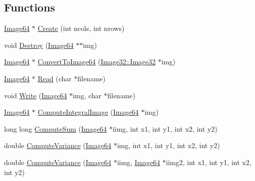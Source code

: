 \subsection*{Functions}
\begin{DoxyCompactItemize}
\item 
\hyperlink{namespacegft_1_1Image64_ac41e270d01650c5cce783ab7e97ccab0}{Image64} $\ast$ \hyperlink{namespacegft_1_1Image64_a6b21c5315c407dfab9d48562bffd18aa}{Create} (int ncols, int nrows)
\item 
void \hyperlink{namespacegft_1_1Image64_ad4e315bef549fd02b6aa360a12f1257e}{Destroy} (\hyperlink{namespacegft_1_1Image64_ac41e270d01650c5cce783ab7e97ccab0}{Image64} $\ast$$\ast$img)
\item 
\hyperlink{namespacegft_1_1Image64_ac41e270d01650c5cce783ab7e97ccab0}{Image64} $\ast$ \hyperlink{namespacegft_1_1Image64_a18d56eac55850a444e967ede8e39d41d}{Convert\-To\-Image64} (\hyperlink{namespacegft_1_1Image32_a6c5a03566b593bb406f1fe33266a0382}{Image32\-::\-Image32} $\ast$img)
\item 
\hyperlink{namespacegft_1_1Image64_ac41e270d01650c5cce783ab7e97ccab0}{Image64} $\ast$ \hyperlink{namespacegft_1_1Image64_abfdf774cb9cbb358fed29ce835f423e6}{Read} (char $\ast$filename)
\item 
void \hyperlink{namespacegft_1_1Image64_afb033b881c692bf92d3495720ce76ab8}{Write} (\hyperlink{namespacegft_1_1Image64_ac41e270d01650c5cce783ab7e97ccab0}{Image64} $\ast$img, char $\ast$filename)
\item 
\hyperlink{namespacegft_1_1Image64_ac41e270d01650c5cce783ab7e97ccab0}{Image64} $\ast$ \hyperlink{namespacegft_1_1Image64_a88036e75ca35284f293f94c634096fe1}{Compute\-Integral\-Image} (\hyperlink{namespacegft_1_1Image64_ac41e270d01650c5cce783ab7e97ccab0}{Image64} $\ast$img)
\item 
long long \hyperlink{namespacegft_1_1Image64_a79fa6adfbc60ecb59f0360bfd398204e}{Compute\-Sum} (\hyperlink{namespacegft_1_1Image64_ac41e270d01650c5cce783ab7e97ccab0}{Image64} $\ast$iimg, int x1, int y1, int x2, int y2)
\item 
double \hyperlink{namespacegft_1_1Image64_ad13a5058c4253b3d7c39076fb6153429}{Compute\-Variance} (\hyperlink{namespacegft_1_1Image64_ac41e270d01650c5cce783ab7e97ccab0}{Image64} $\ast$img, int x1, int y1, int x2, int y2)
\item 
double \hyperlink{namespacegft_1_1Image64_ac62a9f99a2620ba81e317b6b945fc7b8}{Compute\-Variance} (\hyperlink{namespacegft_1_1Image64_ac41e270d01650c5cce783ab7e97ccab0}{Image64} $\ast$iimg, \hyperlink{namespacegft_1_1Image64_ac41e270d01650c5cce783ab7e97ccab0}{Image64} $\ast$iimg2, int x1, int y1, int x2, int y2)
$$
\end{DoxyCompactItemize}
